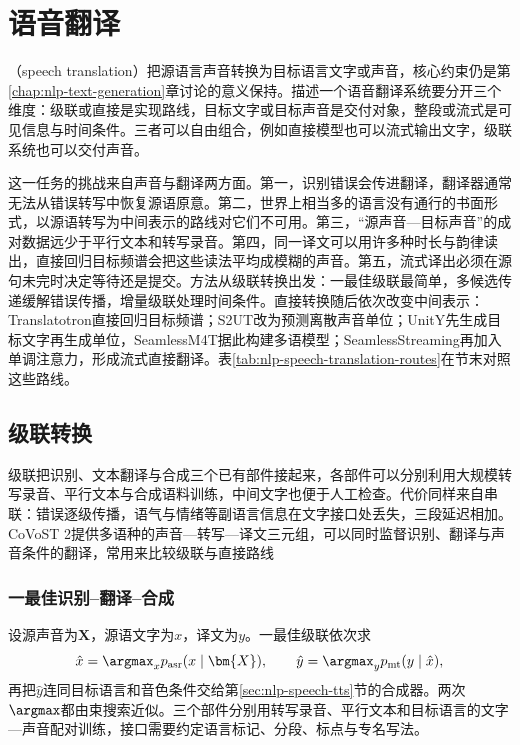 \section{语音翻译}
\label{sec:nlp-speech-translation}

（speech translation）把源语言声音转换为目标语言文字或声音，核心约束仍是第\ref{chap:nlp-text-generation}章讨论的意义保持。描述一个语音翻译系统要分开三个维度：级联或直接是实现路线，目标文字或目标声音是交付对象，整段或流式是可见信息与时间条件。三者可以自由组合，例如直接模型也可以流式输出文字，级联系统也可以交付声音。

这一任务的挑战来自声音与翻译两方面。第一，识别错误会传进翻译，翻译器通常无法从错误转写中恢复源语原意。第二，世界上相当多的语言没有通行的书面形式，以源语转写为中间表示的路线对它们不可用。第三，“源声音—目标声音”的成对数据远少于平行文本和转写录音。第四，同一译文可以用许多种时长与韵律读出，直接回归目标频谱会把这些读法平均成模糊的声音。第五，流式译出必须在源句未完时决定等待还是提交。方法从级联转换出发：一最佳级联最简单，多候选传递缓解错误传播，增量级联处理时间条件。直接转换随后依次改变中间表示：Translatotron直接回归目标频谱；S2UT改为预测离散声音单位；UnitY先生成目标文字再生成单位，SeamlessM4T据此构建多语模型；SeamlessStreaming再加入单调注意力，形成流式直接翻译。表\ref{tab:nlp-speech-translation-routes}在节末对照这些路线。

\subsection{级联转换}
\label{sec:nlp-speech-cascade}

级联把识别、文本翻译与合成三个已有部件接起来，各部件可以分别利用大规模转写录音、平行文本与合成语料训练，中间文字也便于人工检查。代价同样来自串联：错误逐级传播，语气与情绪等副语言信息在文字接口处丢失，三段延迟相加。CoVoST 2提供多语种的声音—转写—译文三元组，可以同时监督识别、翻译与声音条件的翻译，常用来比较级联与直接路线

\subsubsection{一最佳识别–翻译–合成}
\label{sec:nlp-speech-one-best}

设源声音为$\bm{X}$，源语文字为$x$，译文为$y$。一最佳级联依次求
\[
 \hat x=\argmax_x p_{\mathrm{asr}}(x\mid\bm{X}),
 \qquad
 \hat y=\argmax_y p_{\mathrm{mt}}(y\mid\hat x),
\]
再把$\hat y$连同目标语言和音色条件交给第\ref{sec:nlp-speech-tts}节的合成器。两次$\argmax$都由束搜索近似。三个部件分别用转写录音、平行文本和目标语言的文字—声音配对训练，接口需要约定语言标记、分段、标点与专名写法。

